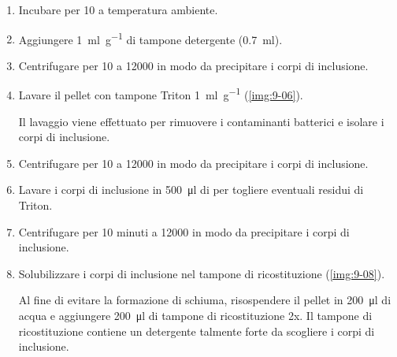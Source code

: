 \begin{enumerate}
\begin{myBox}
	      \end{myBox}
	\item Incubare per \qty{10}{\min} a temperatura ambiente.
	\item Aggiungere \qty{1}{\ml\per\g} di tampone detergente (\qty{0.7}{\ml}).
	\item Centrifugare per \qty{10}{\min} a \qty{12000}{\giri} in modo da precipitare i corpi di inclusione.
	\item Lavare il pellet con tampone Triton \qty{1}{\ml\per\g} (\autoref{img:9-06}).
	      \begin{Note}
		      Il lavaggio viene effettuato per rimuovere i contaminanti batterici e isolare i corpi di inclusione.
	      \end{Note}
	\item Centrifugare per \qty{10}{\min} a \qty{12000}{\giri} in modo da precipitare i corpi di inclusione.
	\item Lavare i corpi di inclusione in \qty{500}{\micro\litre} di  per togliere eventuali residui di Triton.
	\item Centrifugare per 10 minuti a \qty{12000}{\giri} in modo da precipitare i corpi di inclusione.
	\item Solubilizzare i corpi di inclusione nel tampone di ricostituzione (\autoref{img:9-08}). 
	\begin{Note}
		Al fine di evitare la formazione di schiuma, risospendere il pellet in \qty{200}{\micro\litre} di acqua e aggiungere \qty{200}{\micro\litre} di tampone di ricostituzione 2x. Il tampone di ricostituzione contiene un detergente talmente forte da scogliere i corpi di inclusione.
	\end{Note}
\end{enumerate}

